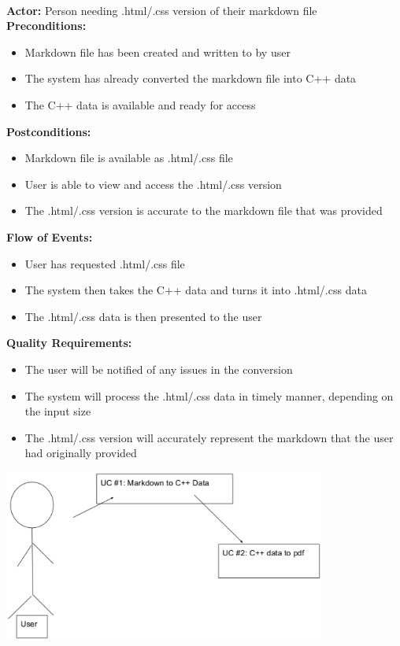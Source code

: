 \\
\textbf{Actor:} Person needing .html/.css version of their markdown file
\\
\textbf{Preconditions:} 
\begin{itemize}
\item Markdown file has been created and written to by user 
\item The system has already converted the markdown file into C++ data
\item The C++ data is available and ready for access 
\end{itemize}
\textbf{Postconditions:} 
\begin{itemize}
\item Markdown file is available as .html/.css file 
\item User is able to view and access the .html/.css version
\item The .html/.css version is accurate to the markdown file that was provided 
\end{itemize}
\textbf{Flow of Events:} 
\begin{itemize} 
\item User has requested .html/.css file
\item The system then takes the C++ data and turns it into .html/.css data 
\item The .html/.css data is then presented to the user 
\end{itemize}
\textbf{Quality Requirements:} 
\begin{itemize}
\item The user will be notified of any issues in the conversion
\item The system will process the .html/.css data in timely manner, depending on the input size 
\item The .html/.css version will accurately represent the markdown that the user had originally provided
%
\end{itemize} 


\includegraphics[width=300pt]{images/useCase.eps}
